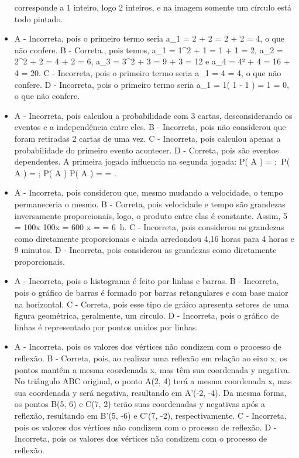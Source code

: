 \begin{itemize}
corresponde a 1 inteiro, logo 2 inteiros, e na imagem somente um círculo
está todo pintado.
\item A - Incorreta, pois o primeiro termo seria
a_{1} = 2  + 2 = 2 + 2 = 4, o que não confere.
B - Correta., pois temos, a_{1} = 1^{2} + 1 = 1 + 1 = 2,
a_{2} = 2^{2} + 2 = 4 + 2 = 6, a_{3} = 3^{2} + 3 = 9 + 3 = 12 e
a_{4} = 4² + 4 = 16 + 4 = 20.
C - Incorreta, pois o primeiro termo seria a_{1} = 4  = 4, o
que não confere.
D - Incorreta, pois o primeiro termo seria
a_{1} = 1\left( 1 - 1 \right) = 1  = 0, o que não confere.
\item A - Incorreta, pois calculou a probabilidade com 3 cartas,
desconsiderando os eventos e a independência entre eles.
B - Incorreta, pois não considerou que foram retiradas 2 cartas de uma
vez.
C - Incorreta, pois calculou apenas a probabilidade do primeiro evento
acontecer.
D - Correta, pois são eventos dependentes. A primeira jogada influencia
na segunda jogada: P\left( A \right) = ;\ P\left( A \right) = ; P\left( A \right) \times P\left( A \right) =  \times {} = .
\item A - Incorreta, pois considerou que, mesmo mudando a velocidade, o tempo
permaneceria o mesmo.
B - Correta, pois velocidade e tempo são grandezas inversamente
proporcionais, logo, o produto entre elas é constante. Assim,
5  = 100x \rightarrow 100x = 600 \rightarrow x =  = 6\ h.
C - Incorreta, pois considerou as grandezas como diretamente
proporcionais e ainda arredondou 4,16 horas para 4 horas e 9 minutos.
D - Incorreta, pois considerou as grandezas como diretamente
proporcionais.
\item A - Incorreta, pois o histograma é feito por linhas e barras.
B - Incorreta, pois o gráfico de barras é formado por barras
retangulares e com base maior na horizontal.
C - Correta, pois esse tipo de gráico apresenta setores de uma figura
geométrica, geralmente, um círculo.
D - Incorreta, pois o gráfico de linhas é representado por pontos unidos
por linhas.
\item A - Incorreta, pois os valores dos vértices não condizem com o processo
de reflexão.
B - Correta, pois, ao realizar uma reflexão em relação ao eixo x, os
pontos mantêm a mesma coordenada x, mas têm sua coordenada y negativa.
No triângulo ABC original, o ponto A(2, 4) terá a mesma coordenada x,
mas sua coordenada y será negativa, resultando em A'(-2, -4). Da mesma
forma, os pontos B(5, 6) e C(7, 2) terão suas coordenadas y negativas
após a reflexão, resultando em B'(5, -6) e C'(7, -2), respectivamente.
C - Incorreta, pois os valores dos vértices não condizem com o processo
de reflexão.
D - Incorreta, pois os valores dos vértices não condizem com o processo
de reflexão.
\end{itemize}

